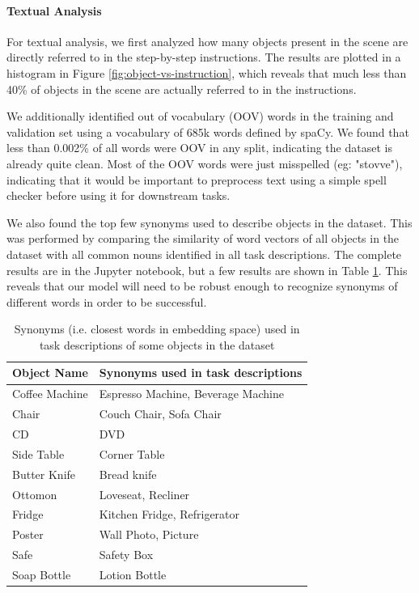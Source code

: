 \documentclass[11pt,a4paper]{article}
\begin{document}
\paragraph{Textual Analysis}
For textual analysis, we first analyzed how many objects present in the scene are directly referred to in the step-by-step instructions. The results are plotted in a histogram in Figure \ref{fig:object-vs-instruction}, which reveals that much less than 40\% of objects in the scene are actually referred to in the instructions. 

We additionally identified out of vocabulary (OOV) words in the training and validation set using a vocabulary of 685k words defined by spaCy. We found that less than 0.002\% of all words were OOV in any split, indicating the dataset is already quite clean. Most of the OOV words were just misspelled (eg: "stovve"), indicating that it would be important to preprocess text using a simple spell checker before using it for downstream tasks.

We also found the top few synonyms used to describe objects in the dataset. This was performed by comparing the similarity of word vectors of all objects in the dataset with all common nouns identified in all task descriptions. The complete results are in the Jupyter notebook, but a few results are shown in Table \ref{tab:synonynms}. This reveals that our model will need to be robust enough to recognize synonyms of different words in order to be successful. 

\begin{table}[H]
\small
\begin{tabular}{@{}ll@{}}
\toprule
Object Name & Synonyms used in task descriptions  \\ \midrule
Coffee Machine & Espresso Machine, Beverage Machine \\
Chair & Couch Chair, Sofa Chair \\
CD   & DVD \\
Side Table & Corner Table \\
Butter Knife & Bread knife \\
Ottomon & Loveseat, Recliner \\
Fridge & Kitchen Fridge, Refrigerator \\
Poster & Wall Photo, Picture \\
Safe & Safety Box \\ 
Soap Bottle & Lotion Bottle
\end{tabular}

\caption{Synonyms (i.e. closest words in embedding space) used in task descriptions of some objects in the dataset}
\label{tab:synonynms}
\end{table}
\end{document}
